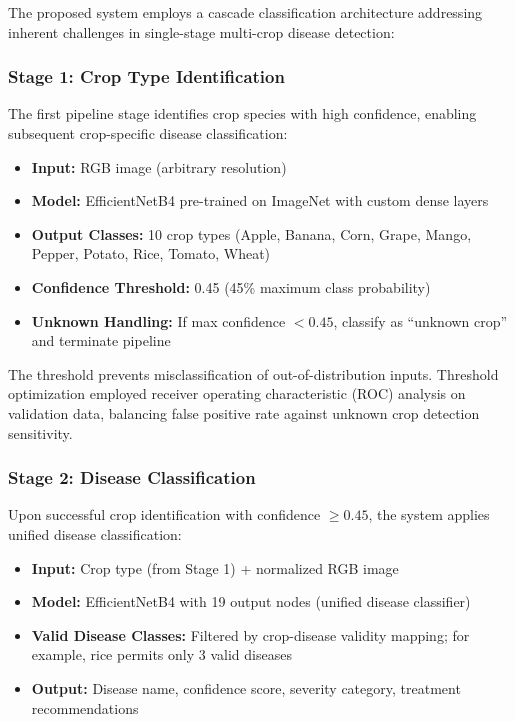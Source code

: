 \documentclass[conference]{IEEEtran}
\begin{document}
The proposed system employs a cascade classification architecture addressing inherent challenges in single-stage multi-crop disease detection:

\subsubsection{Stage 1: Crop Type Identification}

The first pipeline stage identifies crop species with high confidence, enabling subsequent crop-specific disease classification:

\begin{itemize}
\item \textbf{Input:} RGB image (arbitrary resolution)
\item \textbf{Model:} EfficientNetB4 pre-trained on ImageNet with custom dense layers
\item \textbf{Output Classes:} 10 crop types (Apple, Banana, Corn, Grape, Mango, Pepper, Potato, Rice, Tomato, Wheat)
\item \textbf{Confidence Threshold:} 0.45 (45\% maximum class probability)
\item \textbf{Unknown Handling:} If max confidence $< 0.45$, classify as ``unknown crop'' and terminate pipeline
\end{itemize}

The threshold prevents misclassification of out-of-distribution inputs. Threshold optimization employed receiver operating characteristic (ROC) analysis on validation data, balancing false positive rate against unknown crop detection sensitivity.

\subsubsection{Stage 2: Disease Classification}

Upon successful crop identification with confidence $\geq 0.45$, the system applies unified disease classification:

\begin{itemize}
\item \textbf{Input:} Crop type (from Stage 1) + normalized RGB image
\item \textbf{Model:} EfficientNetB4 with 19 output nodes (unified disease classifier)
\item \textbf{Valid Disease Classes:} Filtered by crop-disease validity mapping; for example, rice permits only 3 valid diseases
\item \textbf{Output:} Disease name, confidence score, severity category, treatment recommendations
\end{itemize}
\end{document}

